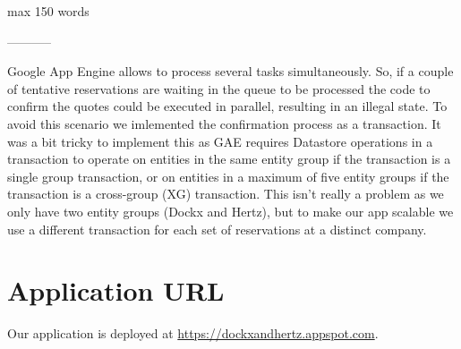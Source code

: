 \documentclass[11pt]{article}
\begin{document}
max 150 words

-----------

Google App Engine allows to process several tasks simultaneously. So, if a couple of tentative reservations are waiting in the queue to be
processed the code to confirm the quotes could be executed in parallel, resulting in an illegal state. To avoid this scenario we imlemented 
the confirmation process as a transaction. It was a bit tricky to implement this as GAE requires Datastore operations in a transaction to 
operate on entities in the same entity group if the transaction is a single group transaction, or on entities in a maximum of five entity 
groups if the transaction is a cross-group (XG) transaction. This isn't really a problem as we only have two entity groups (Dockx and Hertz), 
but to make our app scalable we use a different transaction for each set of reservations at a distinct company.

\section*{Application URL}
Our application is deployed at \url{https://dockxandhertz.appspot.com}.
\end{document}
